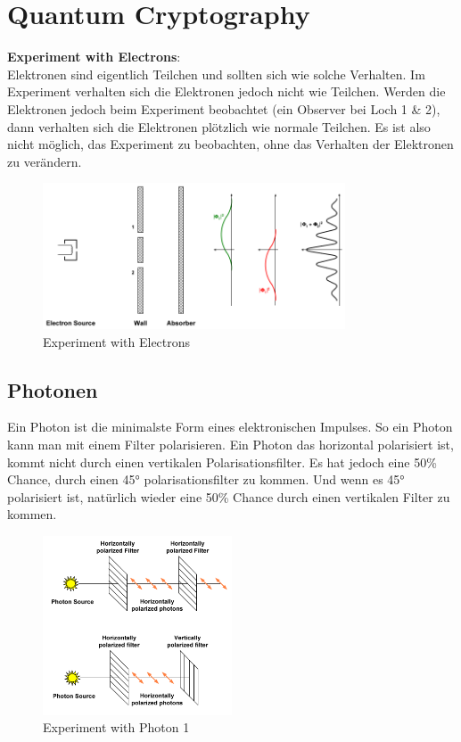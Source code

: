 \hypertarget{quantum-cryptography}{%
\section{Quantum Cryptography}\label{quantum-cryptography}}

\textbf{Experiment with Electrons}:\\
Elektronen sind eigentlich Teilchen und sollten sich wie solche
Verhalten. Im Experiment verhalten sich die Elektronen jedoch nicht wie
Teilchen. Werden die Elektronen jedoch beim Experiment beobachtet (ein
Observer bei Loch 1 \& 2), dann verhalten sich die Elektronen plötzlich
wie normale Teilchen. Es ist also nicht möglich, das Experiment zu
beobachten, ohne das Verhalten der Elektronen zu verändern.

\begin{figure}[H]
\centering
\includegraphics[width=0.8\textwidth]{figures/experimentElectron.png}
\caption{Experiment with Electrons}
\end{figure}

\hypertarget{photonen}{%
\subsection{Photonen}\label{photonen}}

Ein Photon ist die minimalste Form eines elektronischen Impulses. So ein
Photon kann man mit einem Filter polarisieren. Ein Photon das horizontal
polarisiert ist, kommt nicht durch einen vertikalen Polarisationsfilter.
Es hat jedoch eine 50\% Chance, durch einen 45° polarisationsfilter zu
kommen. Und wenn es 45° polarisiert ist, natürlich wieder eine 50\%
Chance durch einen vertikalen Filter zu kommen.

\begin{figure}[H]
\centering
\includegraphics[width=0.5\textwidth]{figures/photonExperiment1.png}
\caption{Experiment with Photon 1}
\end{figure}

